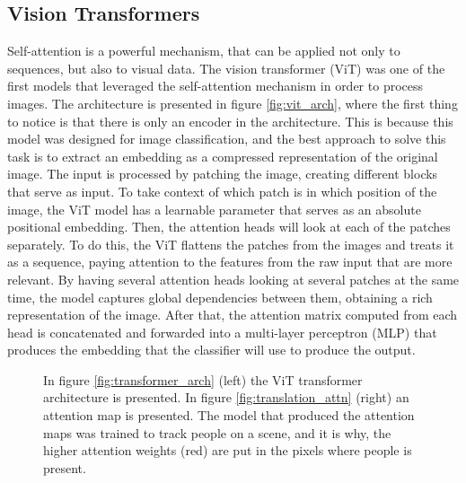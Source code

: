 \subsection{Vision Transformers}
\label{sec:vis-transformers}
Self-attention is a powerful mechanism, that can be applied not only to sequences, but also to visual data. The vision transformer (ViT) \cite{vit} was one of the first models that leveraged the self-attention mechanism in order to process images. The architecture is presented in figure \ref{fig:vit_arch}, where the first thing to notice is that there is only an encoder in the architecture. This is because this model was designed for image classification, and the best approach to solve this task is to extract an embedding as a compressed representation of the original image. The input is processed by patching the image, creating different blocks that serve as input. To take context of which patch is in which position of the image, the ViT model has a learnable parameter that serves as an absolute positional embedding. Then, the attention heads will look at each of the patches separately. To do this, the ViT flattens the patches from the images and treats it as a sequence, paying attention to the features from the raw input that are more relevant. By having several attention heads looking at several patches at the same time, the model captures global dependencies between them, obtaining a rich representation of the image. After that, the attention matrix computed from each head is concatenated and forwarded into a multi-layer perceptron (MLP) that produces the embedding that the classifier will use to produce the output.

\begin{figure}[!h] 
	\centering
	\hfill%
	\caption{In figure \ref{fig:transformer_arch} (left) the ViT transformer architecture is presented. In figure \ref{fig:translation_attn} (right) an attention map is presented. The model that produced the attention maps was trained to track people on a scene, and it is why, the higher attention weights (red) are put in the pixels where people is present.}
\end{figure}


